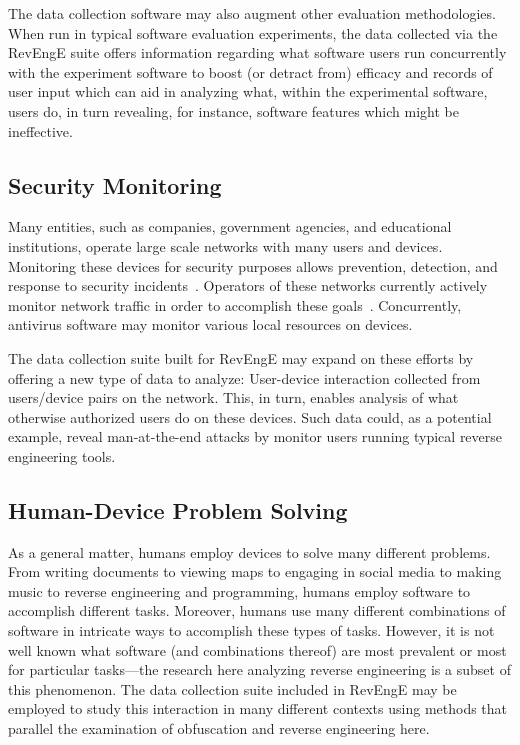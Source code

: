 The data collection software may also augment other evaluation methodologies.  When run in typical software evaluation experiments, the data collected via the RevEngE suite offers information regarding what software users run concurrently with the experiment software to boost (or detract from) efficacy and records of user input which can aid in analyzing what, within the experimental software, users do, in turn revealing, for instance, software features which might be ineffective.

\subsection{Security Monitoring}

Many entities, such as companies, government agencies, and educational institutions, operate large scale networks with many users and devices.  Monitoring these devices for security purposes allows prevention, detection, and response to security incidents~\cite{kent2006guide}.  Operators of these networks currently actively monitor network traffic in order to accomplish these goals~\cite{binde2011assessing}.  Concurrently, antivirus software may monitor various local resources on devices.

The data collection suite built for RevEngE may expand on these efforts by offering a new type of data to analyze:  User-device interaction collected from users/device pairs on the network.  This, in turn, enables analysis of what otherwise authorized users do on these devices.  Such data could, as a potential example, reveal man-at-the-end attacks by monitor users running typical reverse engineering tools.

\subsection{Human-Device Problem Solving}

As a general matter, humans employ devices to solve many different problems.  From writing documents to viewing maps to engaging in social media to making music to reverse engineering and programming, humans employ software to accomplish different tasks.  Moreover, humans use many different combinations of software in intricate ways to accomplish these types of tasks.  However, it is not well known what software (and combinations thereof) are most prevalent or most for particular tasks---the research here analyzing reverse engineering is a subset of this phenomenon.  The data collection suite included in RevEngE may be employed to study this interaction in many different contexts using methods that parallel the examination of obfuscation and reverse engineering here.

